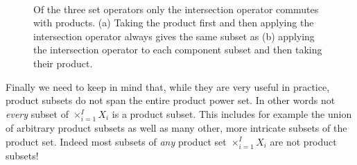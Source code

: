 \documentclass[
  letterpaper,
  DIV=11,
  numbers=noendperiod]{scrartcl}
\begin{document}
\begin{figure}
\begin{minipage}[t]{0.70\linewidth}
{\centering 


}

\subcaption{\label{fig-ip}}
\end{minipage}%
%
\begin{minipage}[t]{0.15\linewidth}

{\centering 

~

}

\end{minipage}%

\caption{\label{fig-product-set-intersection}Of the three set operators
only the intersection operator commutes with products. (a) Taking the
product first and then applying the intersection operator always gives
the same subset as (b) applying the intersection operator to each
component subset and then taking their product.}

\end{figure}

Finally we need to keep in mind that, while they are very useful in
practice, product subsets do not span the entire product power set. In
other words not \emph{every} subset of \(\times_{i = 1}^{I} X_{i}\) is a
product subset. This includes for example the union of arbitrary product
subsets as well as many other, more intricate subsets of the product
set. Indeed most subsets of \emph{any} product set
\(\times_{i = 1}^{I} X_{i}\) are not product subsets!
\end{document}
